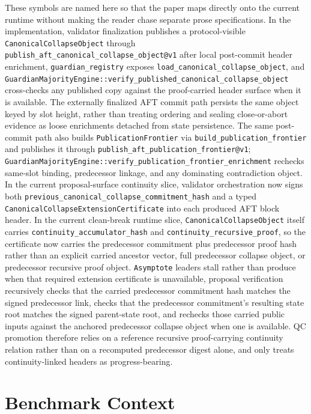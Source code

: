 \documentclass[11pt]{article}
\newcommand{\code}[1]{\texttt{#1}}
\begin{document}
These symbols are named here so that the paper maps directly onto the current
runtime without making the reader chase separate prose specifications. In the
implementation, validator finalization publishes a protocol-visible
\code{CanonicalCollapseObject} through
\code{publish\_aft\_canonical\_collapse\_object@v1} after local post-commit
header enrichment, \code{guardian\_registry} exposes
\code{load\_canonical\_collapse\_object}, and
\code{GuardianMajorityEngine::verify\_published\_canonical\_collapse\_object}
cross-checks any published copy against the proof-carried header surface when
it is available. The externally finalized AFT commit path persists the same
object keyed by slot height, rather than treating ordering and sealing
close-or-abort evidence as loose enrichments detached from state persistence.
The same post-commit path also builds \code{PublicationFrontier} via
\code{build\_publication\_frontier} and publishes it through
\code{publish\_aft\_publication\_frontier@v1};
\code{GuardianMajorityEngine::verify\_publication\_frontier\_enrichment}
rechecks same-slot binding, predecessor linkage, and any dominating
contradiction object.
In the current proposal-surface continuity slice, validator orchestration now
signs both \code{previous\_canonical\_collapse\_commitment\_hash} and a typed
\code{CanonicalCollapseExtensionCertificate} into each produced AFT block
header.
In the current clean-break runtime slice, \code{CanonicalCollapseObject}
itself carries \code{continuity\_accumulator\_hash} and
\code{continuity\_recursive\_proof}, so the certificate now carries the
predecessor commitment plus predecessor proof hash rather than an explicit
carried ancestor vector, full predecessor collapse object, or predecessor
recursive proof object.
\code{Asymptote} leaders stall rather than produce when that required
extension certificate is unavailable, proposal verification recursively
checks that the carried predecessor commitment hash matches the signed
predecessor link, checks that the predecessor commitment's resulting state root matches the
signed parent-state root, and rechecks those carried public inputs against the
anchored predecessor collapse object when one is available. QC promotion
therefore relies on a reference recursive proof-carrying continuity relation
rather than on a recomputed predecessor digest alone, and only treats continuity-linked
headers as progress-bearing.

\section{Benchmark Context}
\end{document}
